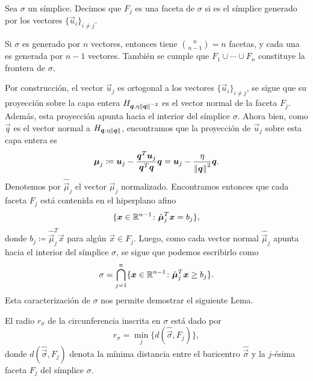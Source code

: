 \begin{definition}
	Sea $\sigma$ un símplice. Decimos que $F_j$ es una faceta de $\sigma$ si es el símplice generado
	por los vectores $\lbrace \vec{u}_i \rbrace_{i \neq j}$.
\end{definition}
\begin{observation}
	Si $\sigma$ es generado por $n$ vectores, entonces tiene $\binom{n}{n-1} = n$ facetas, y cada
	una es generada por $n - 1$ vectores. También se cumple que $F_1 \cup \cdots \cup F_n$
	constituye la frontera de $\sigma$.
\end{observation}

Por construcción, el vector $\vec{u}_j$ es ortogonal a los vectores $\lbrace \vec{u}_i \rbrace_{i
\neq j}$, se sigue que su proyección sobre la capa entera $H_{\boldsymbol{q}, \eta\left\lVert \boldsymbol{q} \right\rVert^{-2}}$ es
el vector normal de la faceta $F_j$. Además, esta proyección apunta hacia el interior del símplice
$\sigma$. Ahora bien, como $\vec{q}$ es el vector normal a $H_{\boldsymbol{q}, \eta\left\lVert \boldsymbol{q} \right\rVert}$,
encontramos que la proyección de $\vec{u}_j$ sobre esta capa entera es
\begin{equation}
	\label{eq:normal-vector}
	\boldsymbol{\mu}_j \coloneq
	\boldsymbol{u}_j - \frac{\boldsymbol{q}^T\boldsymbol{u}_j}{\boldsymbol{q}^T\boldsymbol{q}}\boldsymbol{q}
	=
	\boldsymbol{u}_j - \frac{\eta}{\left\lVert \boldsymbol{q} \right\rVert^2}\boldsymbol{q}.
\end{equation}
Denotemos por $\hat{\vec{\mu}}_j$ el vector $\vec{\mu}_j$ normalizado. Encontramos entonces que cada
faceta $F_j$ está contenida en el hiperplano afino
\begin{equation*}
	\lbrace \boldsymbol{x} \in \mathbb{R}^{n-1} \colon \hat{\boldsymbol{\mu}}_j^T\boldsymbol{x} = b_j \rbrace,
\end{equation*}
donde $b_j \coloneq \hat{\vec{\mu}}_j^T\vec{x}$ para algún $\vec{x} \in F_j$. Luego, como cada
vector normal $\hat{\vec{\mu}}_j$ apunta hacia el interior del símplice $\sigma$, se sigue que
podemos escribirlo como
\begin{equation*}
	\sigma = \bigcap_{j=1}^{n} \lbrace \boldsymbol{x} \in \mathbb{R}^{n-1} \colon \hat{\boldsymbol{\mu}}^T_j\boldsymbol{x} \geq b_j \rbrace.
\end{equation*}
Esta caracterización de $\sigma$ nos permite demostrar el siguiente Lema.
\begin{lemma}
	\label{lemma:sigma-radius}
	El radio $r_\sigma$ de la circunferencia inscrita en $\sigma$ está dado por
	\begin{equation*}
		r_\sigma = \min_{j} \lbrace d(\hat{\vec{\sigma}}, F_j) \rbrace,
	\end{equation*}
	donde $d(\hat{\vec{\sigma}}, F_j)$ denota la mínima distancia entre el baricentro
	$\hat{\vec{\sigma}}$ y la $j$-ésima faceta $F_j$ del símplice $\sigma$.
\end{lemma}

